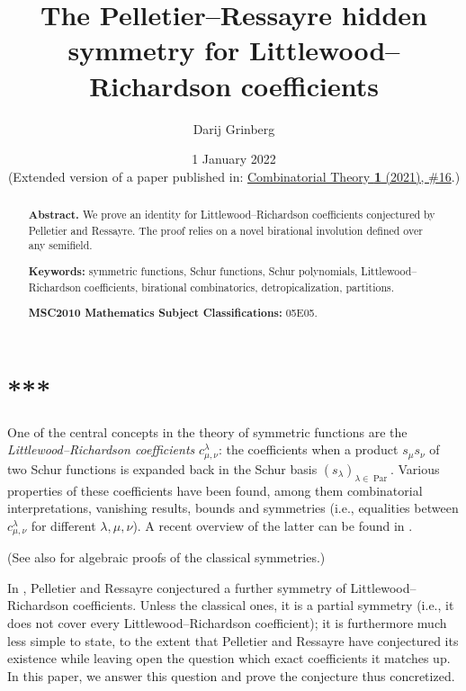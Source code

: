 \documentclass[numbers=enddot,12pt,final,onecolumn,notitlepage]{scrartcl}%
\theoremstyle{definition}
\newenvironment{noncompile}{}{}
\begin{document}
\title{The Pelletier--Ressayre hidden symmetry for Littlewood--Richardson coefficients}
\author{Darij Grinberg}
\date{
1 January 2022
\\
(Extended version of a paper published in:
\href{https://doi.org/10.5070/C61055382}{Combinatorial Theory \textbf{1}
(2021), \#16}.)}
\maketitle

\begin{abstract}
\textbf{Abstract.} We prove an identity for Littlewood--Richardson
coefficients conjectured by Pelletier and Ressayre. The proof relies on a
novel birational involution defined over any semifield.

\textbf{Keywords:} symmetric functions, Schur functions, Schur polynomials,
Littlewood--Richardson coefficients, birational combinatorics,
detropicalization, partitions.

\textbf{MSC2010 Mathematics Subject Classifications:} 05E05.

\end{abstract}
\tableofcontents

\section*{***}

One of the central concepts in the theory of symmetric functions are the
\textit{Littlewood--Richardson coefficients} $c_{\mu,\nu}^{\lambda}$: the
coefficients when a product $s_{\mu}s_{\nu}$ of two Schur functions is
expanded back in the Schur basis $\left(  s_{\lambda}\right)  _{\lambda
\in\operatorname*{Par}}$. Various properties of these coefficients have been
found, among them combinatorial interpretations, vanishing results, bounds and
symmetries (i.e., equalities between $c_{\mu,\nu}^{\lambda}$ for different
$\lambda,\mu,\nu$). A recent overview of the latter can be found in
\cite{BriRos20}.

\begin{noncompile}
(See also \cite[Exercises 2.7.11(c), 2.9.15(c) and 2.9.16(c)]{GriRei} for
algebraic proofs of the classical symmetries.)
\end{noncompile}

In \cite{PelRes20}, Pelletier and Ressayre conjectured a further symmetry of
Littlewood--Richardson coefficients. Unless the classical ones, it is a
partial symmetry (i.e., it does not cover every Littlewood--Richardson
coefficient); it is furthermore much less simple to state, to the extent that
Pelletier and Ressayre have conjectured its existence while leaving open the
question which exact coefficients it matches up. In this paper, we answer this
question and prove the conjecture thus concretized.
\end{document}
